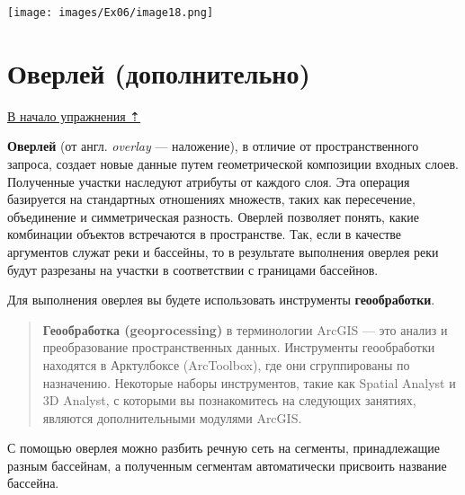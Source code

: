 \documentclass[12pt,]{book}
\begin{document}
\texttt{[image: images/Ex06/image18.png]}

\hypertarget{map-ref-hydrogeologic-overlay}{%
\section{Оверлей (дополнительно)}\label{map-ref-hydrogeologic-overlay}}

\protect\hyperlink{map-ref-hydrogeologic}{В начало упражнения ⇡}

\textbf{Оверлей} (от англ. \emph{overlay} --- наложение), в отличие от пространственного запроса, создает новые данные путем геометрической композиции входных слоев. Полученные участки наследуют атрибуты от каждого слоя. Эта операция базируется на стандартных отношениях множеств, таких как пересечение, объединение и симметрическая разность. Оверлей позволяет понять, какие комбинации объектов встречаются в пространстве. Так, если в качестве аргументов служат реки и бассейны, то в результате выполнения оверлея реки будут разрезаны на участки в соответствии с границами бассейнов.

Для выполнения оверлея вы будете использовать инструменты \textbf{геообработки}.

\begin{quote}
\textbf{Геообработка (geoprocessing)} в терминологии ArcGIS --- это анализ и преобразование пространственных данных. Инструменты геообработки находятся в Арктулбоксе (ArcToolbox), где они сгруппированы по назначению. Некоторые наборы инструментов, такие как Spatial Analyst и 3D Analyst, с которыми вы познакомитесь на следующих занятиях, являются дополнительными модулями ArcGIS.
\end{quote}

С помощью оверлея можно разбить речную сеть на сегменты, принадлежащие разным бассейнам, а полученным сегментам автоматически присвоить название бассейна.
\end{document}
